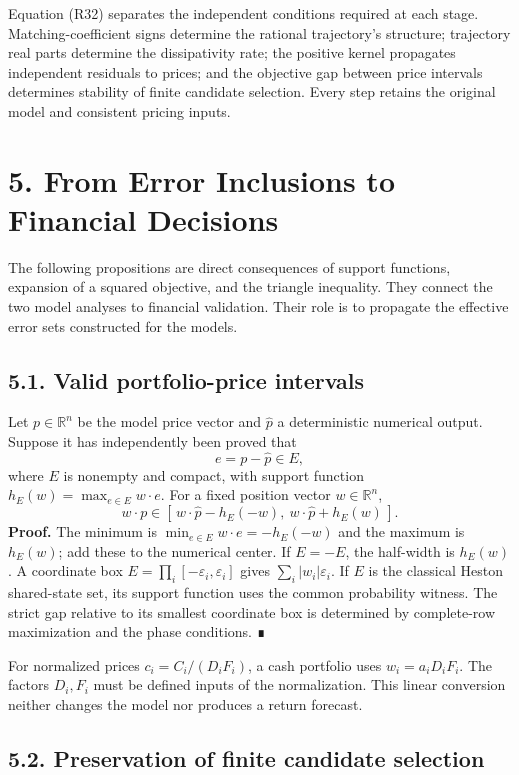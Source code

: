 \documentclass[a4paper,11pt]{article}
\begin{document}
Equation (R32) separates the independent conditions required at each stage. Matching-coefficient signs determine the rational trajectory's structure; trajectory real parts determine the dissipativity rate; the positive kernel propagates independent residuals to prices; and the objective gap between price intervals determines stability of finite candidate selection. Every step retains the original model and consistent pricing inputs.

\section*{5. From Error Inclusions to Financial Decisions}

The following propositions are direct consequences of support functions, expansion of a squared objective, and the triangle inequality. They connect the two model analyses to financial validation. Their role is to propagate the effective error sets constructed for the models.

\subsection*{5.1. Valid portfolio-price intervals}

Let \(p\in\mathbb R^n\) be the model price vector and \(\widehat p\) a deterministic numerical output. Suppose it has independently been proved that
\[
e=p-\widehat p\in E,
\]
where \(E\) is nonempty and compact, with support function \(h_E(w)=\max_{e\in E}w\cdot e\). For a fixed position vector \(w\in\mathbb R^n\),
\[
w\cdot p\in[\,w\cdot\widehat p-h_E(-w),\ w\cdot\widehat p+h_E(w)\,].
\tag{D.1}
\]
\textbf{Proof.} The minimum is \(\min_{e\in E}w\cdot e=-h_E(-w)\) and the maximum is \(h_E(w)\); add these to the numerical center. If \(E=-E\), the half-width is \(h_E(w)\). A coordinate box \(E=\prod_i[-\varepsilon_i,\varepsilon_i]\) gives \(\sum_i|w_i|\varepsilon_i\). If \(E\) is the classical Heston shared-state set, its support function uses the common probability witness. The strict gap relative to its smallest coordinate box is determined by complete-row maximization and the phase conditions. ∎

For normalized prices \(c_i=C_i/(D_iF_i)\), a cash portfolio uses \(w_i=a_iD_iF_i\). The factors \(D_i,F_i\) must be defined inputs of the normalization. This linear conversion neither changes the model nor produces a return forecast.

\subsection*{5.2. Preservation of finite candidate selection}
\end{document}
